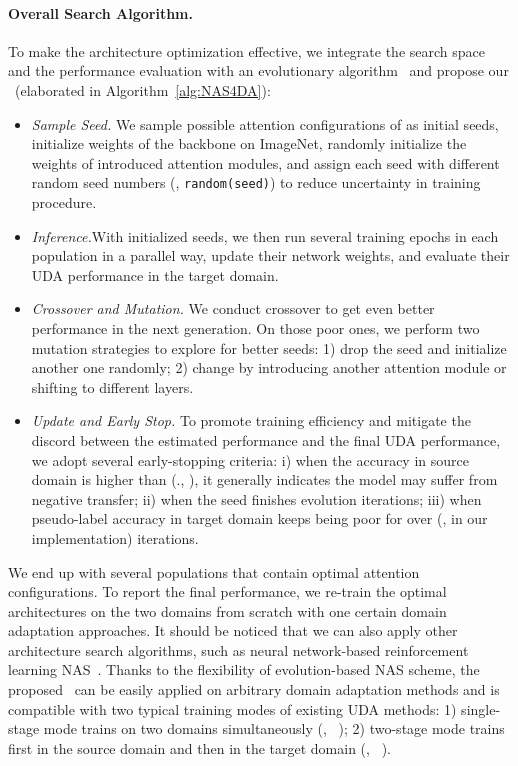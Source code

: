 \documentclass[10pt,twocolumn,letterpaper]{article}
\begin{document}
%
 
\vspace{-3mm}
\paragraph{Overall Search Algorithm.}
To make the architecture optimization effective, we integrate the search space and the performance evaluation with an evolutionary algorithm~\cite{back1996evolutionary} and propose our \iMethod\  (elaborated in Algorithm~\ref{alg:NAS4DA}):
\begin{itemize}[leftmargin=*]
    \setlength{\itemsep}{0pt}
    \setlength{\parsep}{0pt}
    \item \textit{Sample Seed.}
    We sample  possible attention configurations of  as initial seeds, initialize weights of the backbone on ImageNet, randomly initialize the weights of introduced attention modules, and assign each seed with different random seed numbers (\eg, \texttt{random(seed)}) to reduce uncertainty in training procedure.

    \item \textit{Inference.}With initialized seeds, we then run several training epochs in each population in a parallel way, update their network weights, and evaluate their UDA performance  in the target domain.

    \item \textit{Crossover and Mutation.} We conduct crossover to get even better performance in the next generation. On those poor ones, we perform two mutation strategies to explore for better seeds: 1) drop the seed and initialize another one randomly; 2) change  by introducing another attention module or shifting to different layers.

    \item \textit{Update and Early Stop.} To promote training efficiency and mitigate the discord between the estimated performance and the final UDA performance, we adopt several early-stopping criteria: i) when the accuracy in source domain is higher than  (\eg., ), it generally indicates the model may suffer from negative transfer;
    ii) when the seed finishes  evolution iterations;
    iii) when pseudo-label accuracy in target domain keeps being poor for over  (\eg,  in our implementation) iterations.
\end{itemize}

We end up with several populations that contain optimal attention configurations.
To report the final performance, we re-train the optimal architectures on the two domains from scratch with one certain domain adaptation approaches.
It should be noticed that we can also apply other architecture search algorithms, such as neural network-based reinforcement learning NAS~\cite{zoph2018NASNet}.
Thanks to the flexibility of evolution-based NAS scheme, the proposed \iMethod\  can be easily applied on arbitrary domain adaptation methods and is compatible with two typical training modes of existing UDA methods: 1) single-stage mode trains on two domains simultaneously (\eg, ~\cite{long2018CDAN,wang2020PAN}); 2) two-stage mode trains first in the source domain and then in the target domain (\eg, ~\cite{liang2020shot,ge2020MMT}).
\end{document}
